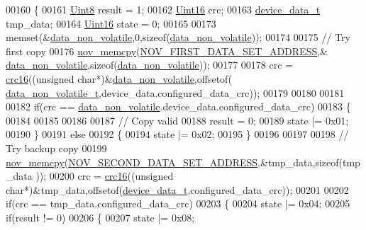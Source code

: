 \begin{DoxyCode}
00160 \{
00161     \hyperlink{a00072_af84840501dec18061d18a68c162a8fa2}{Uint8}                result = 1;
00162     \hyperlink{a00072_a59a9f6be4562c327cbfb4f7e8e18f08b}{Uint16}               crc;
00163     \hyperlink{a00022_a95029dff9c90f6a6907353ba86eb3f33}{device\_data\_t}        tmp\_data;
00164     \hyperlink{a00072_a59a9f6be4562c327cbfb4f7e8e18f08b}{Uint16}               state = 0;
00165 
00173     memset(&\hyperlink{a00060_a76ac5f917f5308dcd83de0d7c94559fb}{data\_non\_volatile},0,\textcolor{keyword}{sizeof}(\hyperlink{a00060_a76ac5f917f5308dcd83de0d7c94559fb}{data\_non\_volatile}));
00174 
00175     \textcolor{comment}{// Try first copy}
00176     \hyperlink{a00060_a3ff681f3af83ec441535611dac6ada16}{nov\_memcpy}(\hyperlink{a00029_a3d5917eef9709c44acd2e6314619f440}{NOV\_FIRST\_DATA\_SET\_ADDRESS},&
      \hyperlink{a00060_a76ac5f917f5308dcd83de0d7c94559fb}{data\_non\_volatile},\textcolor{keyword}{sizeof}(\hyperlink{a00060_a76ac5f917f5308dcd83de0d7c94559fb}{data\_non\_volatile}));
00177 
00178     crc = \hyperlink{a00060_a6553827687db2137ee550ad6e1d2f316}{crc16}((\textcolor{keywordtype}{unsigned} \textcolor{keywordtype}{char}*)&\hyperlink{a00060_a76ac5f917f5308dcd83de0d7c94559fb}{data\_non\_volatile},offsetof(
      \hyperlink{a00022_a8e66478e65e03ebc9434466e51c0ad0b}{data\_non\_volatile\_t},device\_data.configured\_data\_crc));
00179 
00180 
00181 
00182     \textcolor{keywordflow}{if}(crc == \hyperlink{a00060_a76ac5f917f5308dcd83de0d7c94559fb}{data\_non\_volatile}.device\_data.configured\_data\_crc)
00183     \{
00184 
00185      
00186 
00187         \textcolor{comment}{// Copy valid}
00188         result = 0;
00189         state |= 0x01;
00190     \}
00191     \textcolor{keywordflow}{else}
00192     \{
00194         state |= 0x02;
00195     \}
00196 
00197 
00198    \textcolor{comment}{//   Try backup copy}
00199       \hyperlink{a00060_a3ff681f3af83ec441535611dac6ada16}{nov\_memcpy}(\hyperlink{a00029_ab062741a69ee7156fbdf317ec627b4ca}{NOV\_SECOND\_DATA\_SET\_ADDRESS},&tmp\_data,\textcolor{keyword}{sizeof}(tmp\_data
      ));
00200       crc = \hyperlink{a00060_a6553827687db2137ee550ad6e1d2f316}{crc16}((\textcolor{keywordtype}{unsigned} \textcolor{keywordtype}{char}*)&tmp\_data,offsetof(\hyperlink{a00022_a95029dff9c90f6a6907353ba86eb3f33}{device\_data\_t},configured\_data\_crc));
00201 
00202     \textcolor{keywordflow}{if}(crc == tmp\_data.configured\_data\_crc)
00203     \{
00204         state |= 0x04;
00205         \textcolor{keywordflow}{if}(result != 0)
00206         \{
00207             state |= 0x08;

\end{DoxyCode}
